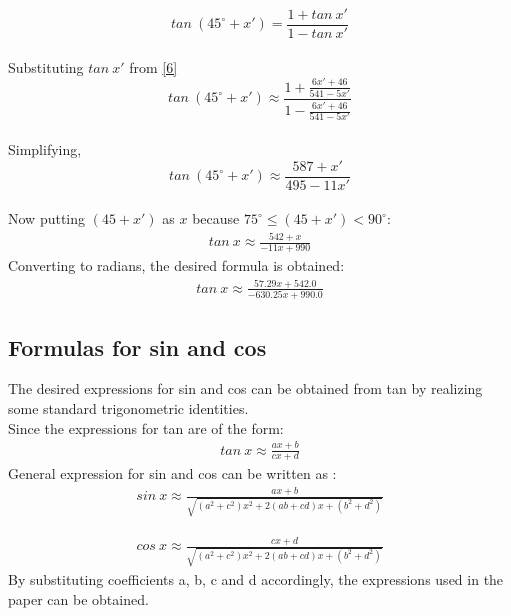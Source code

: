 \documentclass[12pt,twoside, letterpaper, margin=1in]{article}
\begin{document}
$$tan~(45^\circ+x')=\frac{1+tan~x'}{1-tan~x'}$$
\\
Substituting $tan~x'$ from \eqref{6}
\\
$$tan~(45^\circ+x')\approx \frac{1+\frac{6x'+46}{541-5x'}}{1-\frac{6x'+46}{541-5x'}}$$
\\
\vspace{1.5pt}
Simplifying,
\\
\vspace{1.5pt}
$$tan~(45^\circ+x')\approx\frac{587+x'}{495-11x'}$$
\\
Now putting $(45+x')$ as $x$ because $75^\circ \leq (45+x') < 90^\circ$:
\\
\begin{align}
tan~x \approx \frac{542+x}{-11x+990} \label{10}
\end{align}
Converting to radians, the desired formula is obtained: 
\\
\vspace{1.5pt}
\begin{align}
tan~x \approx \frac{57.29 x + 542.0}{-630.25 x + 990.0}
\end{align}

\subsection{Formulas for sin and cos}
The desired expressions for sin and cos can be obtained from tan by realizing some standard trigonometric identities.\\
Since the expressions for tan are of the form: 
\vspace{1.5pt}
\begin{align}
tan~x \approx \frac{ax + b}{cx + d}
\end{align}
General expression for sin and cos can be written as :\\
\vspace{1.5pt}
\begin{align}
sin~x \approx \frac{ax + b}{\sqrt{(a^2 + c^2)x^2 + 2(ab + cd)x + (b^2 + d^2)}}
\end{align}

\vspace{1.5pt}
\begin{align}
cos~x \approx \frac{cx + d}{\sqrt{(a^2 + c^2)x^2 + 2(ab + cd)x + (b^2 + d^2)}}
\end{align}
By substituting coefficients a, b, c and d accordingly, the expressions used in the paper can be obtained.

\label{'ubl'}  
\end{document}
